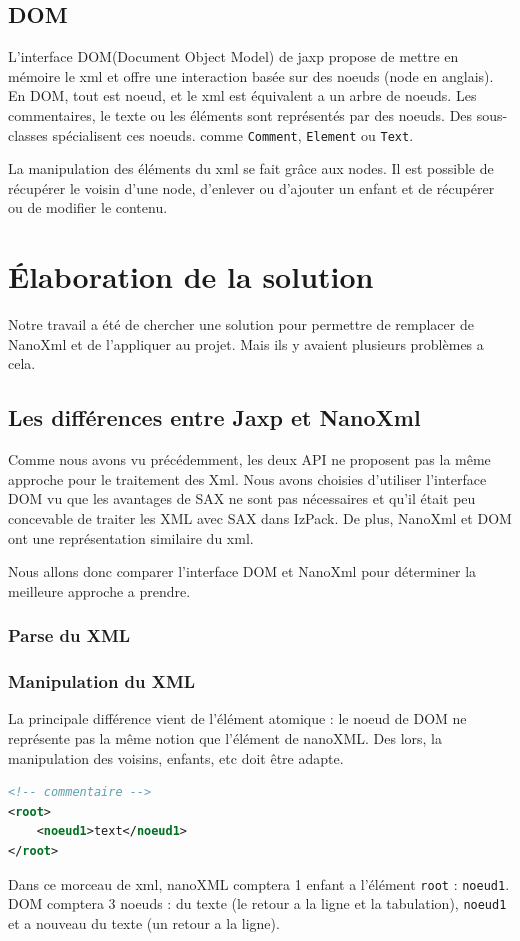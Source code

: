 \subsection{DOM}
L'interface DOM(Document Object Model) de jaxp propose de mettre en mémoire le xml et offre une interaction basée sur des noeuds (node en anglais). En DOM, tout est noeud, et le xml est équivalent a un arbre de noeuds. Les commentaires, le texte ou les éléments sont représentés par des noeuds. Des sous-classes spécialisent ces noeuds. comme \verb|Comment|, \verb|Element| ou \verb|Text|.

La manipulation des éléments du xml se fait grâce aux nodes. Il est possible de récupérer le voisin d'une node, d'enlever ou d'ajouter un enfant et de récupérer ou de modifier le contenu.
\section{Élaboration de la solution}
Notre travail a été de chercher une solution pour permettre de remplacer de NanoXml et de l'appliquer au projet. Mais ils y avaient plusieurs problèmes a cela.
\subsection{Les différences entre Jaxp et NanoXml}
Comme nous avons vu précédemment, les deux API ne proposent pas la même approche pour le traitement des Xml. Nous avons choisies d'utiliser l'interface DOM vu que les avantages de SAX ne sont pas nécessaires et qu'il était peu concevable de traiter les XML avec SAX dans IzPack. De plus, NanoXml et DOM ont une représentation similaire du xml.

Nous allons donc comparer l'interface DOM et NanoXml pour déterminer la meilleure approche a prendre.
\subsubsection{Parse du XML}

\subsubsection{Manipulation du XML}
La principale différence vient de l'élément atomique : le noeud de DOM ne représente pas la même notion que l'élément de nanoXML. Des lors, la manipulation des voisins, enfants, etc doit être adapte.
\begin{lstlisting}[language=xml]
<!-- commentaire -->
<root>
	<noeud1>text</noeud1>
</root>
\end{lstlisting}
Dans ce morceau de xml, nanoXML comptera 1 enfant a l'élément \verb|root| : \verb|noeud1|. DOM comptera 3 noeuds : du texte (le retour a la ligne et la tabulation), \verb|noeud1| et a nouveau du texte (un retour a la ligne).

